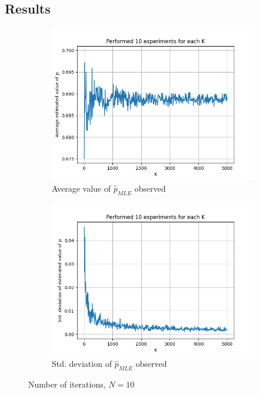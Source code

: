 \documentclass[fleqn, 11pt]{article}
\begin{document}
\subsection{Results}
\begin{figure}[H]
    \centering
    \begin{subfigure}[H]{0.49\textwidth}
        \centering
        \includegraphics[width=\textwidth]{P2_p/avgs_10.png}
        \caption[]{Average value of $\hat{p}_{MLE}$ observed}
    \end{subfigure}
    \begin{subfigure}[H]{0.49\textwidth}
        \centering
        \includegraphics[width=\textwidth]{P2_p/stds_10.png}
        \caption[]{Std. deviation of $\hat{p}_{MLE}$ observed}
    \end{subfigure}
    \caption{Number of iterations, $N = 10$}
\end{figure}
\end{document}
